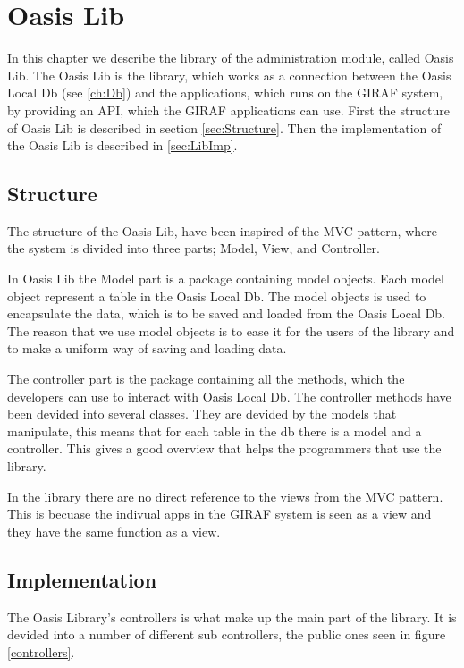 \chapter{Oasis Lib}
\label{ch:Lib}
In this chapter we describe the library of the administration module, called Oasis Lib. The Oasis Lib is the library, which works as a connection between the Oasis Local Db (see \autoref{ch:Db}) and the applications, which runs on the GIRAF system, by providing an API, which the GIRAF applications can use. First the structure of Oasis Lib is described in section \vref{sec:Structure}. Then the implementation of the Oasis Lib is described in \autoref{sec:LibImp}.

\section{Structure}
\label{sec:Structure}
The structure of the Oasis Lib, have been inspired of the MVC pattern, where the system is divided into three parts; Model, View, and Controller. 

In Oasis Lib the Model part is a package containing model objects. Each model object represent a table in the Oasis Local Db.
The model objects is used to encapsulate the data, which is to be saved and loaded from the Oasis Local Db.
The reason that we use model objects is to ease it for the users of the library and to make a uniform way of saving and loading data. 

The controller part is the package containing all the methods, which the developers can use to interact with Oasis Local Db.
The controller methods have been devided into several classes.
They are devided by the models that manipulate, this means that for each table in the db there is a model and a controller.
This gives a good overview that helps the programmers that use the library.

In the library there are no direct reference to the views from the MVC pattern.
This is becuase the indivual apps in the GIRAF system is seen as a view and they have the same function as a view.

\section{Implementation}
\label{sec:LibImp}
The Oasis Library's controllers is what make up the main part of the library. It is devided into a number of different sub controllers, the public ones seen in figure \vref{controllers}.

